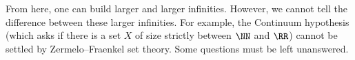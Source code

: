 \documentclass[../notes.tex]{subfiles}
\begin{document}
\begin{remark}
	From here, one can build larger and larger infinities. However, we cannot tell the difference between these larger infinities. For example, the Continuum hypothesis (which asks if there is a set $X$ of size strictly between $\NN$ and $\RR$) cannot be settled by Zermelo--Fraenkel set theory. Some questions must be left unanswered.
\end{remark}
\end{document}
